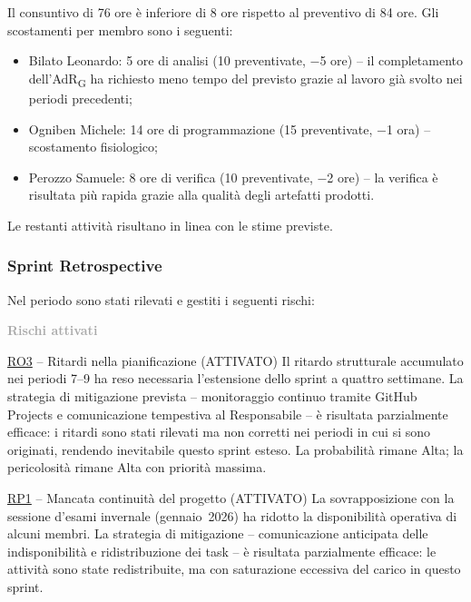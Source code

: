 \documentclass[a4paper, 11pt, oneside]{scrartcl} %
\begin{document}
Il consuntivo di 76 ore è inferiore di 8 ore rispetto al preventivo di 84 ore.
Gli scostamenti per membro sono i seguenti:
\begin{itemize}[noitemsep, topsep=2pt]
  \item Bilato Leonardo: 5 ore di analisi (10 preventivate, $-$5 ore) -- il completamento dell'AdR\textsubscript{G} ha richiesto meno tempo del previsto grazie al lavoro già svolto nei periodi precedenti;
  \item Ogniben Michele: 14 ore di programmazione (15 preventivate, $-$1 ora) -- scostamento fisiologico;
  \item Perozzo Samuele: 8 ore di verifica (10 preventivate, $-$2 ore) -- la verifica è risultata più rapida grazie alla qualità degli artefatti prodotti.
\end{itemize}
Le restanti attività risultano in linea con le stime previste.

\subsubsection*{Sprint Retrospective}

Nel periodo sono stati rilevati e gestiti i seguenti rischi:

\vspace{0.1cm}
\noindent\textcolor{DarkGray}{\textbf{Rischi attivati}}
\begin{description}[noitemsep, topsep=2pt]
  \item \hyperref[sec:ro3]{RO3} -- Ritardi nella pianificazione (ATTIVATO)
    Il ritardo strutturale accumulato nei periodi 7--9 ha reso necessaria l'estensione dello sprint a quattro settimane. La strategia di mitigazione prevista -- monitoraggio continuo tramite GitHub Projects e comunicazione tempestiva al Responsabile -- è risultata parzialmente efficace: i ritardi sono stati rilevati ma non corretti nei periodi in cui si sono originati, rendendo inevitabile questo sprint esteso. La probabilità rimane Alta; la pericolosità rimane Alta con priorità massima.

  \item \hyperref[sec:rp1]{RP1} -- Mancata continuità del progetto (ATTIVATO)
    La sovrapposizione con la sessione d'esami invernale (gennaio~2026) ha ridotto la disponibilità operativa di alcuni membri. La strategia di mitigazione -- comunicazione anticipata delle indisponibilità e ridistribuzione dei task -- è risultata parzialmente efficace: le attività sono state redistribuite, ma con saturazione eccessiva del carico in questo sprint.
\end{description}
\end{document}
